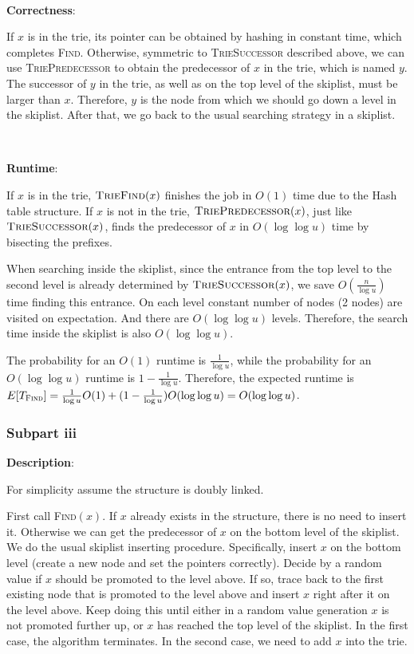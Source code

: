 \documentclass{article}
\begin{document}
~

\noindent\textbf{Correctness}:


If $x$ is in the trie, its pointer can be obtained by hashing in constant time, which completes \textsc{Find}. Otherwise, symmetric to \textsc{TrieSuccessor} described above, we can use \textsc{TriePredecessor} to obtain the predecessor of $x$ in the trie, which is named $y$. The successor of $y$ in the trie, as well as on the top level of the skiplist, must be larger than $x$. Therefore, $y$ is the node from which we should go down a level in the skiplist. After that, we go back to the usual searching strategy in a skiplist.

~

\noindent\textbf{Runtime}:

If $x$ is in the trie, $\textsc{TrieFind}(x)$ finishes the job in $O(1)$ time due to the Hash table structure. If $x$ is not in the trie, $\textsc{TriePredecessor}(x)$, just like $\textsc{TrieSuccessor}(x)$, finds the predecessor of $x$ in $O(\log\log u)$ time by bisecting the prefixes.

When searching inside the skiplist, since the entrance from the top level to the second level is already determined by $\textsc{TrieSuccessor}(x)$, we save $O(\frac{n}{\log u})$ time finding this entrance. On each level constant number of nodes (2 nodes) are visited on expectation. And there are $O(\log\log u)$ levels. Therefore, the search time inside the skiplist is also $O(\log\log u)$.

The probability for an $O(1)$ runtime is $\frac{1}{\log u}$, while the probability for an $O(\log\log u)$ runtime is $1-\frac{1}{\log u}$. Therefore, the expected runtime is $E[T_\textsc{Find}]=\frac{1}{\log u}O(1)+(1-\frac{1}{\log u})O(\log\log u)=O(\log\log u)$.


\subsubsection{Subpart iii}
\noindent\textbf{Description}:

For simplicity assume the structure is doubly linked.

First call \textsc{Find}$(x)$. If $x$ already exists in the structure, there is no need to insert it. Otherwise we can get the predecessor of $x$ on the bottom level of the skiplist. We do the usual skiplist inserting procedure. Specifically, insert $x$ on the bottom level (create a new node and set the pointers correctly). Decide by a random value if $x$ should be promoted to the level above. If so, trace back to the first existing node that is promoted to the level above and insert $x$ right after it on the level above. Keep doing this until either in a random value generation $x$ is not promoted further up, or $x$ has reached the top level of the skiplist. In the first case, the algorithm terminates. In the second case, we need to add $x$ into the trie.
\end{document}
